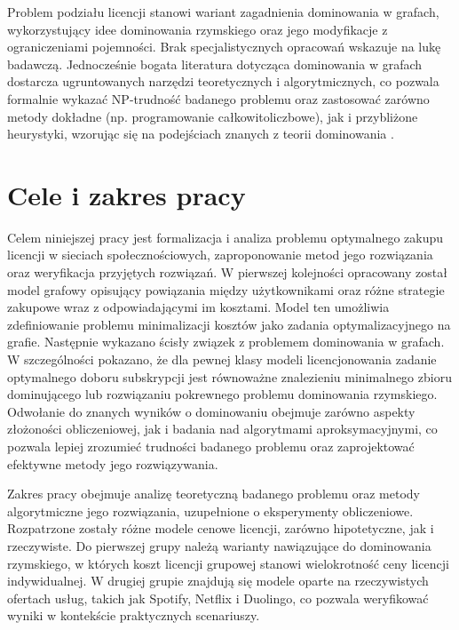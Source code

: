 Problem podziału licencji stanowi wariant zagadnienia dominowania w grafach, wykorzystujący idee dominowania rzymskiego oraz jego modyfikacje z ograniczeniami pojemności. Brak specjalistycznych opracowań wskazuje na lukę badawczą. Jednocześnie bogata literatura dotycząca dominowania w grafach dostarcza ugruntowanych narzędzi teoretycznych i algorytmicznych, co pozwala formalnie wykazać NP-trudność badanego problemu oraz zastosować zarówno metody dokładne (np. programowanie całkowitoliczbowe), jak i przybliżone heurystyki, wzorując się na podejściach znanych z teorii dominowania \cite{Roman2DominationSurvey, CapDom}.


\section{Cele i zakres pracy}
Celem niniejszej pracy jest formalizacja i analiza problemu optymalnego zakupu licencji w sieciach społecznościowych, zaproponowanie metod jego rozwiązania oraz weryfikacja przyjętych rozwiązań. W pierwszej kolejności opracowany został model grafowy opisujący powiązania między użytkownikami oraz różne strategie zakupowe wraz z odpowiadającymi im kosztami. Model ten umożliwia zdefiniowanie problemu minimalizacji kosztów jako zadania optymalizacyjnego na grafie. Następnie wykazano ścisły związek z problemem dominowania w grafach. W szczególności pokazano, że dla pewnej klasy modeli licencjonowania zadanie optymalnego doboru subskrypcji jest równoważne znalezieniu minimalnego zbioru dominującego lub rozwiązaniu pokrewnego problemu dominowania rzymskiego. Odwołanie do znanych wyników o dominowaniu obejmuje zarówno aspekty złożoności obliczeniowej, jak i badania nad algorytmami aproksymacyjnymi, co pozwala lepiej zrozumieć trudności badanego problemu oraz zaprojektować efektywne metody jego rozwiązywania.

Zakres pracy obejmuje analizę teoretyczną badanego problemu oraz metody algorytmiczne jego rozwiązania, uzupełnione o eksperymenty obliczeniowe. Rozpatrzone zostały różne modele cenowe licencji, zarówno hipotetyczne, jak i rzeczywiste. Do pierwszej grupy należą warianty nawiązujące do dominowania rzymskiego, w których koszt licencji grupowej stanowi wielokrotność ceny licencji indywidualnej. W drugiej grupie znajdują się modele oparte na rzeczywistych ofertach usług, takich jak Spotify, Netflix i Duolingo, co pozwala weryfikować wyniki w kontekście praktycznych scenariuszy.


